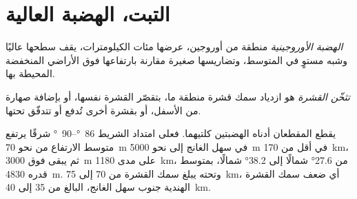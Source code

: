 \section{التبت، الهضبة العالية}\label{sec:b2:himalaya-andes:tibet}

\begin{definition}\label{def:b2:himalaya-andes:plateau}
\emph{الهضبة الأوروجينية} منطقة من أوروجين، عرضها مئات
الكيلومترات، يقف سطحها عاليًا وشبه مستوٍ في المتوسط، وتضاريسها
صغيرة مقارنة بارتفاعها فوق الأراضي المنخفضة المحيطة بها.
\end{definition}

\begin{definition}\label{def:b2:himalaya-andes:thickening}
\emph{تثخّن القشرة} هو ازدياد سمك
قشرة منطقة ما، بتقصّر القشرة نفسها، أو بإضافة صهارة من الأسفل، أو بقشرة
أخرى تُدفع أو تتدفّق تحتها.
\end{definition}

يقطع المقطعان أدناه الهضبتين كلتيهما. فعلى امتداد الشريط \qtyrange{86}{90}{\degree} شرقًا يرتفع متوسط
الارتفاع من نحو \qty{70}{m} في سهل الغانج إلى نحو \qty{5000}{m} في أقل
من \qty{170}{km}، ثم يبقى فوق \qty{3000}{m} على مدى \qty{1180}{km}، من \ang{27.6} شمالًا إلى
\ang{38.2} شمالًا، بمتوسط قدره \qty{4830}{m}. وتحته يبلغ سمك القشرة من 70 إلى \qty{75}{km}،
أي ضعف سمك القشرة الهندية جنوب سهل الغانج، البالغ من 35 إلى \qty{40}{km}.

